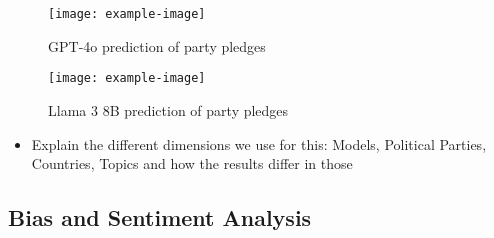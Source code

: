\documentclass{article}
\begin{document}
\begin{figure}[h]
    \centering
    \texttt{[image: example-image]}
    \caption{GPT-4o prediction of party pledges}
    \label{fig:enter-label}
\end{figure}

\begin{figure}[h]
    \centering
    \texttt{[image: example-image]}
    \caption{Llama 3 8B prediction of party pledges}
    \label{fig:enter-label}
\end{figure}



\begin{itemize}
    \item Explain the different dimensions we use for this: Models, Political Parties, Countries, Topics and how the results differ in those 
\end{itemize}







\subsection{Bias and Sentiment Analysis}
\end{document}
